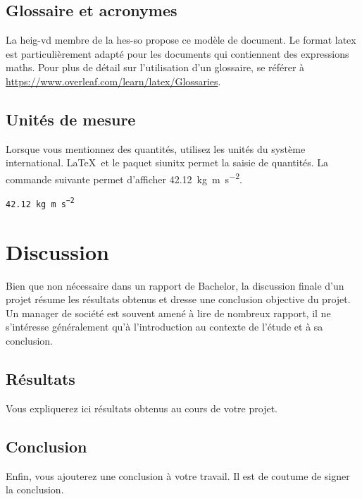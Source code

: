 \documentclass[
    iai, %
    eai, %
    confidential, %
]{heig-tb}
\begin{document}
\section{Glossaire et acronymes}

La \Gls{heig-vd} membre de la \Gls{hes-so} propose ce modèle de document. Le format \Gls{latex} est particulièrement adapté pour les documents qui contiennent des expressions \gls{maths}. Pour plus de détail sur l'utilisation d'un glossaire, se référer à \url{https://www.overleaf.com/learn/latex/Glossaries}.

\section{Unités de mesure}

Lorsque vous mentionnez des quantités, utilisez les unités du système international. \LaTeX~et le paquet \textsf{siunitx} permet la saisie de quantités. La commande suivante permet d'afficher \SI{42.12}{\kilo\gram\metre\per\square\second}.\par

\texttt{\SI{42.12}{\kilo\gram\metre\per\square\second}}\par

\chapter{Discussion}

Bien que non nécessaire dans un rapport de Bachelor, la discussion finale d'un projet résume les résultats obtenus et dresse une conclusion objective du projet. Un manager de société est souvent amené à lire de nombreux rapport, il ne s'intéresse généralement qu'à l'introduction au contexte de l'étude et à sa conclusion.

\section{Résultats}
Vous expliquerez ici résultats obtenus au cours de votre projet.

\section{Conclusion}
Enfin, vous ajouterez une conclusion à votre travail. Il est de coutume de signer la conclusion.

\vfil
\hspace{8cm}\makeatletter\@author\makeatother\par
\hspace{8cm}\begin{minipage}{5cm}
\end{minipage}
\clearpage
\end{document}

